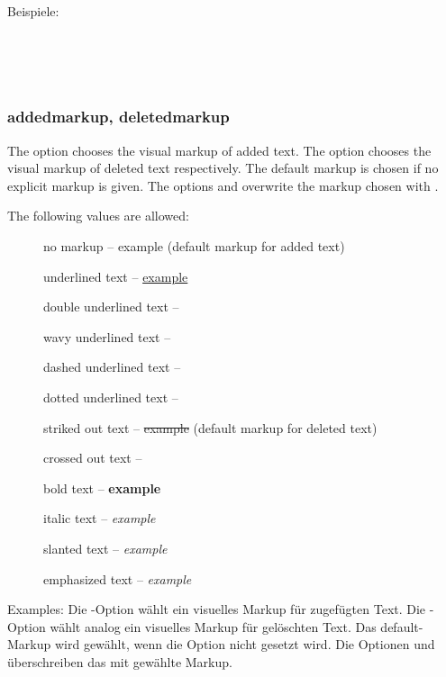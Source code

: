		Beispiele:
	\fi

\\
\\
\\

\subsubsection{addedmarkup, deletedmarkup}
\ifENGLISH
	The  option chooses the visual markup of added text.
	The  option chooses the visual markup of deleted text respectively.
	The default markup is chosen if no explicit markup is given.
	The options  and  overwrite the markup chosen with .

	The following values are allowed:
	\begin{description}
		\item [] no markup -- example (default markup for added text)
		\item [] underlined text -- \uline{example}
		\item [] double underlined text -- 
		\item [] wavy underlined text -- 
		\item [] dashed underlined text -- 
		\item [] dotted underlined text -- 
		\item [] striked out text -- \sout{example} (default markup for deleted text)
		\item [] crossed out text -- 
		\item [] bold text -- \textbf{example}
		\item [] italic text -- \textit{example}
		\item [] slanted text -- \textsl{example}
		\item [] emphasized text -- \emph{example}
	\end{description}

	Examples:
\fi
	\ifGERMAN
		Die -Option wählt ein visuelles Markup für zugefügten Text.
		Die -Option wählt analog ein visuelles Markup für gelöschten Text.
		Das default-Markup wird gewählt, wenn die Option nicht gesetzt wird.
		Die Optionen  und  überschreiben das mit  gewählte Markup.

